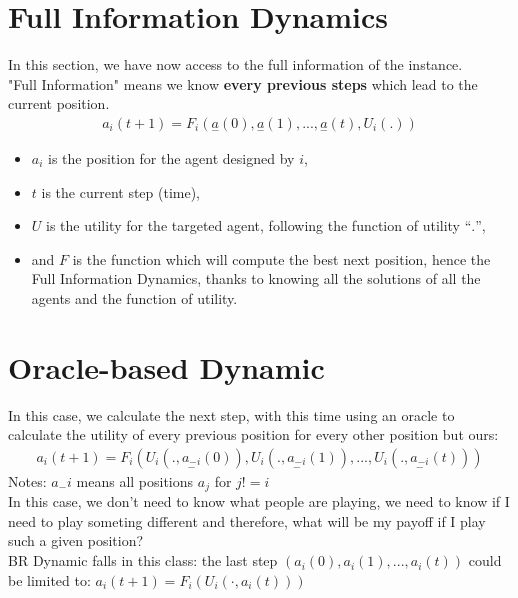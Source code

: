 \section{Full Information Dynamics}
In this section, we have now access to the full information of the instance.\\
"Full Information" means we know \textbf{every previous steps} which lead to the current position.
\begin{equation}\label{eq:10}
\begin{aligned}
a_i(t + 1) = F_i(\underset{-}{a}(0), \underset{-}{a}(1), ..., \underset{-}{a}(t), U_i(.))
\end{aligned}
\end{equation}
\begin{itemize}
\item $a_i$ is the position for the agent designed by $i$,
\item $t$ is the current step (time),
\item $U$ is the utility for the targeted agent, following the function of utility “$.$”,
\item and $F$ is the function which will compute the best next position, hence the Full Information Dynamics, thanks to knowing all the solutions of all the agents and the function of utility.
\end{itemize}
\section{Oracle-based Dynamic}
In this case, we calculate the next step, with this time using an oracle to calculate the utility of every previous position for every other position but ours:
\begin{equation}\label{eq:11}
\begin{aligned}
a_i(t + 1) = F_i(U_i(., \underset{-}{a_{-i}}(0)), U_i(., \underset{-}{a_{-i}}(1)), ..., U_i(., \underset{-}{a_{-i}}(t)))
\end{aligned}
\end{equation}
Notes: $a_-i$ means all positions $a_j$ for $j != i$\\
In this case, we don't need to know what people are playing, we need to know if I need to play someting different and therefore, what will be my payoff if I play such a given position?\\
BR Dynamic falls in this class: the last step $(a_i(0), a_i(1), ..., a_i(t))$ could be limited to: $a_i(t + 1) = F_i(U_i(⋅, a_i(t)))$
